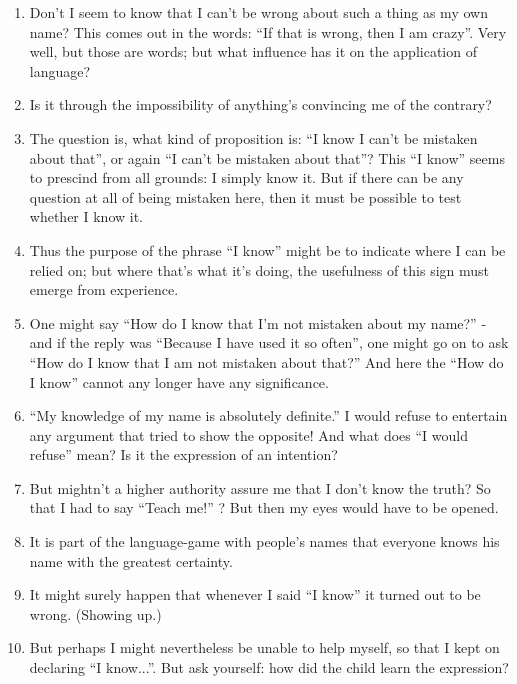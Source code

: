 \documentclass{book}
\begin{document}
\begin{enumerate}
\item
Don't I seem to know that I can't be wrong about such a thing as my own name?
This comes out in the words: ``If that is wrong, then I am crazy''. Very well,
but those are words; but what influence has it on the application of language?

\item
Is it through the impossibility of anything's convincing me of the contrary?

\item
The question is, what kind of proposition is: ``I know I can't be mistaken
about that'', or again ``I can't be mistaken about that''?  This ``I know''
seems to prescind from all grounds: I simply know it. But if there can be any
question at all of being mistaken here, then it must be possible to test
whether I know it.

\item
Thus the purpose of the phrase ``I know'' might be to indicate where I can be
relied on; but where that's what it's doing, the usefulness of this sign must
emerge from experience.

\item
One might say ``How do I know that I'm not mistaken about my name?'' - and if
the reply was ``Because I have used it so often'', one might go on to ask ``How
do I know that I am not mistaken about that?'' And here the ``How do I know''
cannot any longer have any significance.

\item
``My knowledge of my name is absolutely definite.'' I would refuse to entertain
any argument that tried to show the opposite!  And what does ``I would refuse''
mean? Is it the expression of an intention?

\item
But mightn't a higher authority assure me that I don't know the truth? So that
I had to say ``Teach me!'' ? But then my eyes would have to be opened.

\item
It is part of the language-game with people's names that everyone knows his
name with the greatest certainty.

\item
It might surely happen that whenever I said ``I know'' it turned out to be
wrong. (Showing up.)

\item
But perhaps I might nevertheless be unable to help myself, so that I kept on
declaring ``I know...''. But ask yourself: how did the child learn the
expression?


\end{enumerate}
\end{document}
